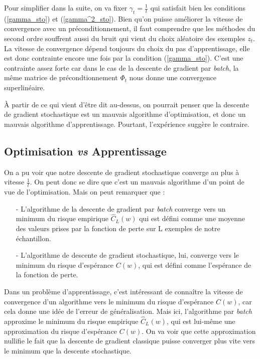\documentclass{article}
\begin{document}
Pour simplifier dans la suite, on va fixer $\gamma_t=\frac{1}{t}$ qui satisfait bien les conditions (\ref{gamma_sto}) et (\ref{gamma^2_sto}). Bien qu'on puisse améliorer la vitesse de convergence avec un préconditionnement, il faut comprendre que les méthodes du second ordre souffrent aussi du bruit qui vient du choix aléatoire des exemples $z_t$. La vitesse de convergence dépend toujours du choix du pas d'apprentissage, elle est donc contrainte encore une fois par la condition (\ref{gamma_sto}). C'est une contrainte assez forte car dans le cas de la descente de gradient par \emph{batch}, la même matrice de précondtionnement $\Phi_t$ nous donne une convergence superlinéaire.
\bigskip 

À partir de ce qui vient d'être dit au-dessus, on pourrait penser que la descente de gradient stochastique est un mauvais algorithme d'optimisation, et donc un mauvais algorithme d'apprentissage. Pourtant, l'expérience suggère le contraire.

\subsection{Optimisation \emph{vs} Apprentissage}
    
On a pu voir que notre descente de gradient stochastique converge au plus à vitesse $\frac{1}{t}$. On peut donc se dire que c'est un mauvais algorithme d'un point de vue de l'optimisation. Mais on peut remarquer que :
\bigskip

\begin{itemize}
    \item[-] L'algorithme de la descente de gradient par \emph{batch} converge vers un minimum du risque empirique $\hat{C}_L(w)$ qui est défini comme une moyenne des valeurs prises par la fonction de perte sur L exemples de notre échantillon. 
    \bigskip

    \item[-] L'algorithme de descente de gradient stochastique, lui, converge vers le minimum du risque d'espérance 
$C(w)$, qui est défini comme l'espérance de la fonction de perte.
\end{itemize}
\bigskip

Dans un problème d'apprentissage, c'est intéressant de connaître la vitesse de convergence d'un algorithme vers le minimum du risque d'espérance $C(w)$, car cela donne une idée de l'erreur de généralisation. Mais ici, l'algorithme par \emph{batch} approxime le minimum du  risque empirique $\hat{C}_L(w)$, qui est lui-même une approximation du risque d'espérance $C(w)$. On va voir que cette approximation nullifie le fait que la descente de gradient classique puisse converger plus vite vers le minimum que la descente stochastique.
\bigskip
\end{document}
